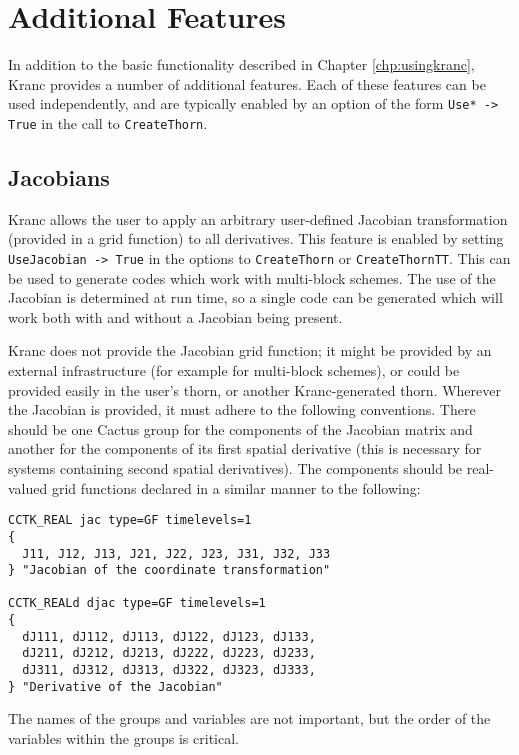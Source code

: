 \documentclass{report}
\begin{document}
\chapter{Additional Features}

In addition to the basic functionality described in Chapter
\ref{chp:usingkranc}, Kranc provides a number of additional features.
Each of these features can be used independently, and are typically
enabled by an option of the form \verb|Use* -> True| in the call to
\verb|CreateThorn|.

\section{Jacobians}

Kranc allows the user to apply an arbitrary user-defined Jacobian
transformation (provided in a grid function) to all derivatives.  This
feature is enabled by setting \verb|UseJacobian -> True| in the
options to \verb|CreateThorn| or \verb|CreateThornTT|.  This can be
used to generate codes which work with multi-block schemes.  The use
of the Jacobian is determined at run time, so a single code can be
generated which will work both with and without a Jacobian being
present.

Kranc does not provide the Jacobian grid function; it might be
provided by an external infrastructure (for example for multi-block
schemes), or could be provided easily in the user's thorn, or another
Kranc-generated thorn.  Wherever the Jacobian is provided, it must
adhere to the following conventions.  There should be one Cactus group
for the components of the Jacobian matrix and another for the
components of its first spatial derivative (this is necessary for
systems containing second spatial derivatives).  The components should
be real-valued grid functions declared in a similar manner to the
following:

\begin{verbatim}
CCTK_REAL jac type=GF timelevels=1
{
  J11, J12, J13, J21, J22, J23, J31, J32, J33
} "Jacobian of the coordinate transformation"

CCTK_REALd djac type=GF timelevels=1
{
  dJ111, dJ112, dJ113, dJ122, dJ123, dJ133,
  dJ211, dJ212, dJ213, dJ222, dJ223, dJ233,
  dJ311, dJ312, dJ313, dJ322, dJ323, dJ333,
} "Derivative of the Jacobian"
\end{verbatim}

The names of the groups and variables are not important, but the order
of the variables within the groups is critical.
\end{document}
